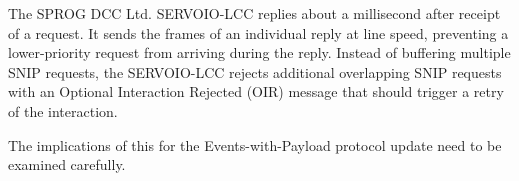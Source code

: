 \documentclass[11pt]{article}
\begin{document}
The SPROG DCC Ltd. SERVOIO-LCC replies about a millisecond after receipt of a 
request.  
It sends the frames of an individual reply
at line speed, preventing a lower-priority request from arriving during the reply.
Instead of buffering multiple SNIP requests, the SERVOIO-LCC rejects additional
overlapping SNIP requests with an 
Optional Interaction Rejected (OIR) message that 
should trigger a retry of the interaction.


The implications of this for the Events-with-Payload protocol update need to be 
examined carefully.
\end{document}
